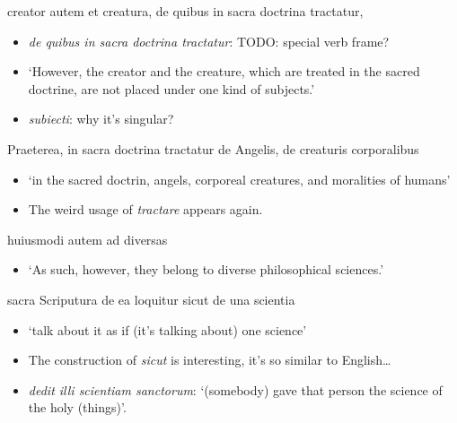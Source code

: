\documentclass[a4paper, 12pt]{article}
\newcommand{\form}[1]{\emph{#1}}
\newcommand{\translate}[1]{`#1'}
\begin{document}
\begin{exe}
    \ex creator autem et creatura, de quibus in sacra doctrina tractatur, 
\end{exe}

\begin{itemize}
    \item \form{de quibus in sacra doctrina tractatur}: TODO: special verb frame? 
    \item \translate{However, the creator and the creature, which are treated in the sacred doctrine, 
    are not placed under one kind of subjects.}
    \item \form{subiecti}: why it's singular?
\end{itemize}

\begin{exe}
    \ex Praeterea, in sacra doctrina tractatur de Angelis, de creaturis corporalibus
\end{exe}

\begin{itemize}
    \item \translate{in the sacred doctrin, angels, corporeal creatures, and moralities of humans}
    \item The weird usage of \form{tractare} appears again.
\end{itemize}

\begin{exe}
    \ex huiusmodi autem ad diversas 
\end{exe}

\begin{itemize}
    \item \translate{As such, however, they belong to diverse philosophical sciences.}
\end{itemize}

\begin{exe}
    \ex sacra Scriputura de ea loquitur sicut de una scientia
\end{exe}

\begin{itemize}
    \item \translate{talk about it as if (it's talking about) one science}
    \item The construction of \form{sicut} is interesting, it's so similar to English\dots
    \item \form{dedit illi scientiam sanctorum}: \translate{(somebody) gave that person the science of the holy (things)}.
\end{itemize}
\end{document}
